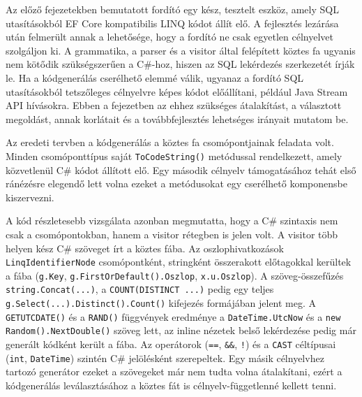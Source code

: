 \label{chap:altalanositas}

Az előző fejezetekben bemutatott fordító egy kész, tesztelt eszköz, amely SQL utasításokból EF Core kompatibilis LINQ kódot állít elő. A fejlesztés lezárása után felmerült annak a lehetősége, hogy a fordító ne csak egyetlen célnyelvet szolgáljon ki. A grammatika, a parser és a visitor által felépített köztes fa ugyanis nem kötődik szükségszerűen a C\#-hoz, hiszen az SQL lekérdezés szerkezetét írják le. Ha a kódgenerálás cserélhető elemmé válik, ugyanaz a fordító SQL utasításokból tetszőleges célnyelvre képes kódot előállítani, például Java Stream API hívásokra. Ebben a fejezetben az ehhez szükséges átalakítást, a választott megoldást, annak korlátait és a továbbfejlesztés lehetséges irányait mutatom be.


Az eredeti tervben a kódgenerálás a köztes fa csomópontjainak feladata volt. Minden csomóponttípus saját \texttt{ToCodeString()} metódussal rendelkezett, amely közvetlenül C\# kódot állított elő. Egy második célnyelv támogatásához tehát első ránézésre elegendő lett volna ezeket a metódusokat egy cserélhető komponensbe kiszervezni.

A kód részletesebb vizsgálata azonban megmutatta, hogy a C\# szintaxis nem csak a csomópontokban, hanem a visitor rétegben is jelen volt. A visitor több helyen kész C\# szöveget írt a köztes fába. Az oszlophivatkozások \texttt{LinqIdentifierNode} csomópontként, stringként összerakott előtagokkal kerültek a fába (\texttt{g.Key}, \texttt{g.FirstOrDefault().Oszlop}, \texttt{x.u.Oszlop}). A szöveg-összefűzés \texttt{string.Concat(...)}, a \texttt{COUNT(DISTINCT ...)} pedig egy teljes \texttt{g.Select(...).Distinct().Count()} kifejezés formájában jelent meg. A \texttt{GETUTCDATE()} és a \texttt{RAND()} függvények eredménye a \texttt{DateTime.UtcNow} és a \texttt{new Random().NextDouble()} szöveg lett, az inline nézetek belső lekérdezése pedig már generált kódként került a fába. Az operátorok (\texttt{==}, \texttt{\&\&}, \texttt{!}) és a \texttt{CAST} céltípusai (\texttt{int}, \texttt{DateTime}) szintén C\# jelölésként szerepeltek. Egy másik célnyelvhez tartozó generátor ezeket a szövegeket már nem tudta volna átalakítani, ezért a kódgenerálás leválasztásához a köztes fát is célnyelv-függetlenné kellett tenni.



